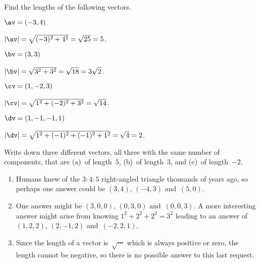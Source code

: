 \begin{example} \label{eg:}
Find the lengths of the following vectors.
\begin{parts}
\item \(\av=(-3,4)\)
\begin{solution} 
\(|\av|=\sqrt{(-3)^2+4^2}=\sqrt{25}=5\). 
\end{solution}

\item \(\bv=(3,3)\)
\begin{solution} 
\(|\bv|=\sqrt{3^2+3^2}=\sqrt{18}=3\sqrt2\). 
\end{solution}


\item \(\cv=(1,-2,3)\)
\begin{solution} 
\(|\cv|=\sqrt{1^2+(-2)^2+3^2}=\sqrt{14}\). 
\end{solution}

\item \(\dv=(1,-1,-1,1)\)
\begin{solution} 
\(|\dv|=\sqrt{1^2+(-1)^2+(-1)^2+1^2}=\sqrt4=2\).
\end{solution}
\end{parts}
\end{example}

\begin{example} \label{eg:}
Write down three different vectors, all three with the same number of components, that are (a)~of length~\(5\), (b)~of length~\(3\), and (c)~of length~\(-2\).
\begin{solution} 
\begin{enumerate}
\item Humans knew of the \(3:4:5\) right-angled triangle thousands of years ago, so perhaps one answer could be \((3,4)\), \((-4,3)\) and~\((5,0)\).
\item One answer might be \((3,0,0)\), \((0,3,0)\) and~\((0,0,3)\). 
A more interesting answer might arise from knowing \(1^2+2^2+2^2=3^2\) leading to an answer of \((1,2,2)\), \((2,-1,2)\) and~\((-2,2,1)\).
\item Since the length of a vector is~\(\sqrt{\cdots}\) which is always positive or zero, the length cannot be negative, so there is no possible answer to this last request.
\end{enumerate}
 
\end{solution}
\end{example}




